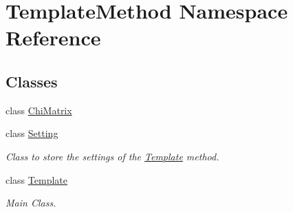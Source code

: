 \hypertarget{namespaceTemplateMethod}{\section{Template\+Method Namespace Reference}
\label{namespaceTemplateMethod}
}
\subsection*{Classes}
\begin{DoxyCompactItemize}
\item 
class \hyperlink{classTemplateMethod_1_1ChiMatrix}{Chi\+Matrix}
\item 
class \hyperlink{classTemplateMethod_1_1Setting}{Setting}
\begin{DoxyCompactList}\small\item\em Class to store the settings of the \hyperlink{classTemplateMethod_1_1Template}{Template} method. \end{DoxyCompactList}\item 
class \hyperlink{classTemplateMethod_1_1Template}{Template}
\begin{DoxyCompactList}\small\item\em Main Class. \end{DoxyCompactList}\end{DoxyCompactItemize}
